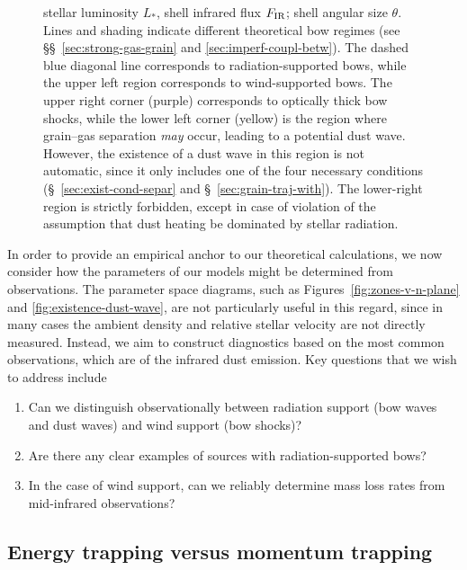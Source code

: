 \begin{figure}
{    stellar luminosity \(L_*\), shell infrared flux \(F_{\text{IR}}\); shell
    angular size \(\theta\).  Lines and shading indicate different
    theoretical bow regimes (see \S\S~\ref{sec:strong-gas-grain} and
    \ref{sec:imperf-coupl-betw}).  The dashed blue diagonal line
    corresponds to radiation-supported bows, while the upper left
    region corresponds to wind-supported bows.  The upper right corner
    (purple) corresponds to optically thick bow shocks, while the
    lower left corner (yellow) is the region where grain--gas
    separation \textit{may} occur, leading to a potential dust wave.
    However, the existence of a dust wave in this region is not
    automatic, since it only includes one of the four necessary
    conditions (\S~\ref{sec:exist-cond-separ} and
    \S~\ref{sec:grain-traj-with}). The lower-right region is strictly
    forbidden, except in case of violation of the assumption that dust
    heating be dominated by stellar radiation. }
  \label{fig:All-sources-eta-tau}
\end{figure}


In order to provide an empirical anchor to our theoretical
calculations, we now consider how the parameters of our models might
be determined from observations.  The parameter space diagrams, such
as Figures~\ref{fig:zones-v-n-plane} and
\ref{fig:existence-dust-wave}, are not particularly useful in this
regard, since in many cases the ambient density and relative stellar
velocity are not directly measured.  Instead, we aim to construct
diagnostics based on the most common observations, which are of the
infrared dust emission.  Key questions that we wish to address include
\begin{enumerate}[1.]
\item Can we distinguish observationally between radiation support
  (bow waves and dust waves) and wind support (bow shocks)?
\item Are there any clear examples of sources with radiation-supported bows?
\item In the case of wind support, can we reliably determine mass loss
  rates from mid-infrared observations?
\end{enumerate}


\subsection{Energy trapping versus momentum trapping}
\label{sec:energy-trapp-vers}

